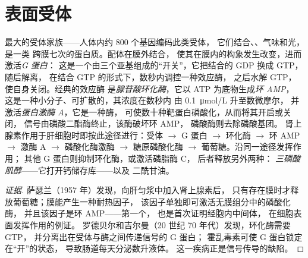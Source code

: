 \section{表面受体}

\begin{proposition}\label{prop:b2:cell-signalling:gpcr}
最大的受体家族——人体内约 \num{800} 个基因编码此类受体，
它们结合、、气味和光，是一类
跨膜七次的蛋白质。配体在膜外结合，
使其在膜内的构象发生改变，进而激活\emph{G 蛋白}：
这是一个由三个亚基组成的“开关”，它把结合的 GDP 换成 GTP，随后解离，
在结合 GTP 的形式下，数秒内调控一种效应酶，
之后水解 GTP，使自身关闭。经典的效应酶
是\emph{腺苷酸环化酶}，它以 ATP 为底物生成\emph{环 AMP}，
这是一种小分子、可扩散的\emph{}，其浓度在数秒内
由 \qty{0.1}{\micro mol/L} 升至数微摩尔，
并激活\emph{蛋白激酶 A}，它是一种酶，
可使数十种靶蛋白磷酸化，从而将其开启或关闭，
信号由磷酸二酯酶终止，该酶破坏环 AMP，
磷酸酶则去除磷酸基团。
肾上腺素作用于肝细胞时即按此途径进行：受体 $\to$ G 蛋白
$\to$ 环化酶 $\to$ 环 AMP $\to$ 激酶 A $\to$ 磷酸化酶激酶
$\to$ 糖原磷酸化酶 $\to$ 葡萄糖。沿同一途径发挥作用；
其他 G 蛋白则抑制环化酶，或激活磷脂酶 C，
后者释放另外两种：
\emph{三磷酸肌醇}——它打开钙储存库——以及
二酰甘油。
\end{proposition}
\begin{proof}[证据]
萨瑟兰（1957 年）发现，向肝匀浆中加入肾上腺素后，
只有存在膜时才释放葡萄糖；膜能产生一种耐热因子，
该因子单独即可激活无膜组分中的磷酸化酶，
并且该因子是环 AMP——第一个，
也是首次证明经胞内中间体，
在细胞表面发挥作用的例证。
罗德贝尔和吉尔曼（20 世纪 70 年代）发现，环化酶需要 GTP，
并分离出在受体与酶之间传递信号的 G 蛋白；
霍乱毒素可使 G 蛋白锁定在“开”的状态，
导致肠道每天分泌数升液体。
这一疾病正是信号传导的缺陷。
\end{proof}

